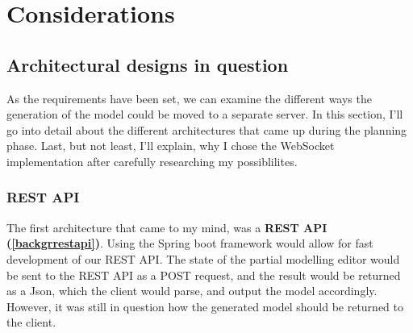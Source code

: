 \chapter{Considerations}\label{considerations}

\section{Architectural designs in question}
As the requirements have been set, we can examine the different ways the generation of the model could be
moved to a separate server. In this section, I'll go into detail about the different architectures that came up during
the planning phase. Last, but not least, I'll explain, why I chose the WebSocket implementation after carefully researching
my possiblilites.

\subsection{REST API}\label{restconsiderations}
The first architecture that came to my mind, was a \textbf{REST API (\ref{backgrrestapi})}. Using the Spring boot framework would allow for fast development
of our REST API. The state of the partial modelling editor would be sent to the REST API as a POST request, and the result
would be returned as a Json, which the client would parse, and output the model accordingly. However, it was still in question
how the generated model should be returned to the client.
